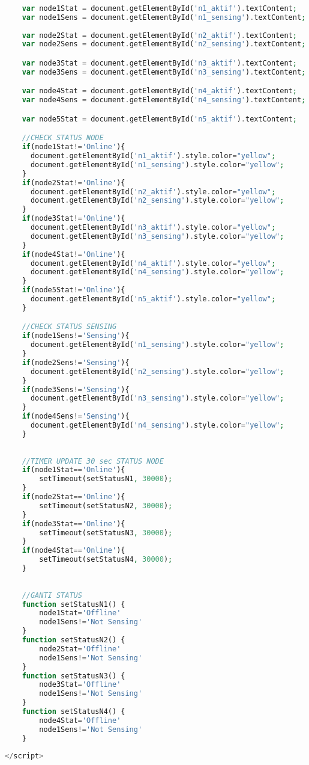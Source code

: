 \begin{lstlisting}[language=PHP, caption=skripsi\_checkstatus.blade.php]
    
    var node1Stat = document.getElementById('n1_aktif').textContent;
    var node1Sens = document.getElementById('n1_sensing').textContent;
    
    var node2Stat = document.getElementById('n2_aktif').textContent;
    var node2Sens = document.getElementById('n2_sensing').textContent;

    var node3Stat = document.getElementById('n3_aktif').textContent;
    var node3Sens = document.getElementById('n3_sensing').textContent;

    var node4Stat = document.getElementById('n4_aktif').textContent;
    var node4Sens = document.getElementById('n4_sensing').textContent;

    var node5Stat = document.getElementById('n5_aktif').textContent;

    //CHECK STATUS NODE
    if(node1Stat!='Online'){
      document.getElementById('n1_aktif').style.color="yellow";
      document.getElementById('n1_sensing').style.color="yellow";
    }
    if(node2Stat!='Online'){
      document.getElementById('n2_aktif').style.color="yellow";
      document.getElementById('n2_sensing').style.color="yellow";
    }
    if(node3Stat!='Online'){
      document.getElementById('n3_aktif').style.color="yellow";
      document.getElementById('n3_sensing').style.color="yellow";
    }
    if(node4Stat!='Online'){
      document.getElementById('n4_aktif').style.color="yellow";
      document.getElementById('n4_sensing').style.color="yellow";
    }
    if(node5Stat!='Online'){
      document.getElementById('n5_aktif').style.color="yellow";
    }

    //CHECK STATUS SENSING
    if(node1Sens!='Sensing'){
      document.getElementById('n1_sensing').style.color="yellow";
    }
    if(node2Sens!='Sensing'){
      document.getElementById('n2_sensing').style.color="yellow";
    }
    if(node3Sens!='Sensing'){
      document.getElementById('n3_sensing').style.color="yellow";
    }
    if(node4Sens!='Sensing'){
      document.getElementById('n4_sensing').style.color="yellow";
    }
    
    
    //TIMER UPDATE 30 sec STATUS NODE
    if(node1Stat=='Online'){
        setTimeout(setStatusN1, 30000);
    }
    if(node2Stat=='Online'){
        setTimeout(setStatusN2, 30000);
    }
    if(node3Stat=='Online'){
        setTimeout(setStatusN3, 30000);
    }
    if(node4Stat=='Online'){
        setTimeout(setStatusN4, 30000);
    }
        
    
    //GANTI STATUS    
    function setStatusN1() {
        node1Stat='Offline'
        node1Sens!='Not Sensing'
    }
    function setStatusN2() {
        node2Stat='Offline'
        node1Sens!='Not Sensing'
    }
    function setStatusN3() {
        node3Stat='Offline'
        node1Sens!='Not Sensing'
    }
    function setStatusN4() {
        node4Stat='Offline'
        node1Sens!='Not Sensing'
    }
    
</script>
\end{lstlisting}


